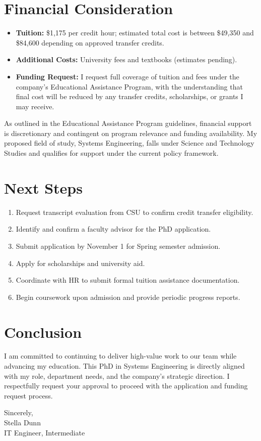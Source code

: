 \documentclass[11pt]{article}
\begin{document}
\section{Financial Consideration}

\begin{itemize}
    \item \textbf{Tuition:} \$1,175 per credit hour; estimated total cost is between \$49,350 and \$84,600 depending on approved transfer credits.
    \item \textbf{Additional Costs:} University fees and textbooks (estimates pending).
    \item \textbf{Funding Request:} I request full coverage of tuition and fees under the company's Educational Assistance Program, with the understanding that final cost will be reduced by any transfer credits, scholarships, or grants I may receive.
\end{itemize}

As outlined in the Educational Assistance Program guidelines, financial support is discretionary and contingent on program relevance and funding availability. My proposed field of study, Systems Engineering, falls under Science and Technology Studies and qualifies for support under the current policy framework.

\section{Next Steps}

\begin{enumerate}
    \item Request transcript evaluation from CSU to confirm credit transfer eligibility.
    \item Identify and confirm a faculty advisor for the PhD application.
    \item Submit application by November 1 for Spring semester admission.
    \item Apply for scholarships and university aid.
    \item Coordinate with HR to submit formal tuition assistance documentation.
    \item Begin coursework upon admission and provide periodic progress reports.
\end{enumerate}

\section*{Conclusion}

I am committed to continuing to deliver high-value work to our team while advancing my education. This PhD in Systems Engineering is directly aligned with my role, department needs, and the company's strategic direction. I respectfully request your approval to proceed with the application and funding request process.

\vspace{1cm}
\noindent Sincerely, \\
Stella Dunn \\
IT Engineer, Intermediate
\end{document}
